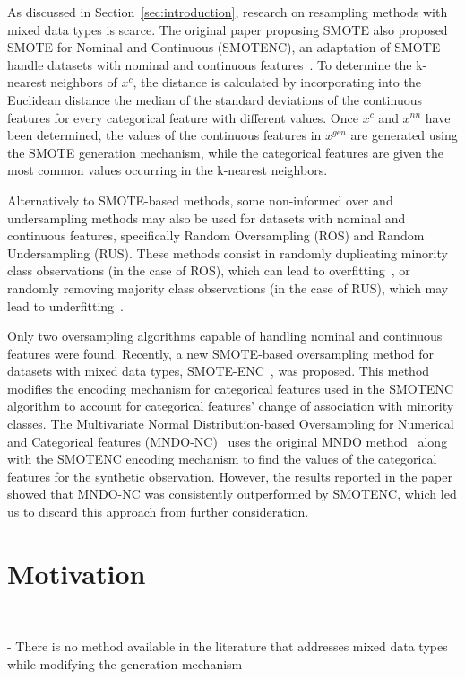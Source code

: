 \documentclass[parskip=full]{scrartcl}
\begin{document}
As discussed in Section~\ref{sec:introduction}, research on resampling methods
with mixed data types is scarce. The original paper proposing SMOTE also
proposed SMOTE for Nominal and Continuous (SMOTENC), an adaptation of SMOTE
handle datasets with nominal and continuous features~\cite{Chawla2002}. To
determine the k-nearest neighbors of $x^c$, the distance is calculated by
incorporating into the Euclidean distance the median of the standard
deviations of the continuous features for every categorical feature with
different values. Once $x^c$ and $x^{nn}$ have been determined, the values of
the continuous features in $x^{gen}$ are generated using the SMOTE generation
mechanism, while the categorical features are given the most common values
occurring in the k-nearest neighbors.

Alternatively to SMOTE-based methods, some non-informed over and undersampling
methods may also be used for datasets with nominal and continuous features,
specifically Random Oversampling (ROS) and Random Undersampling (RUS). These
methods consist in randomly duplicating minority class observations (in the
case of ROS), which can lead to overfitting~\cite{park2021combined,
batista2004study}, or randomly removing majority class observations (in the
case of RUS), which may lead to underfitting~\cite{bansal2021analysis}.

Only two oversampling algorithms capable of handling nominal and continuous
features were found. Recently, a new SMOTE-based oversampling method for
datasets with mixed data types, SMOTE-ENC~\cite{mukherjee2021smote}, was
proposed. This method modifies the encoding mechanism for categorical features
used in the SMOTENC algorithm to account for categorical features' change of
association with minority classes. The Multivariate Normal Distribution-based
Oversampling for Numerical and Categorical features
(MNDO-NC)~\cite{ambai2019multivariate} uses the original MNDO
method~\cite{ambai2018mndo} along with the SMOTENC encoding mechanism to find
the values of the categorical features for the synthetic observation. However,
the results reported in the paper showed that MNDO-NC was consistently
outperformed by SMOTENC, which led us to discard this approach from further
consideration.

\section{Motivation}~\label{sec:motivation}

- There is no method available in the literature that addresses mixed data
  types while modifying the generation mechanism
\end{document}
